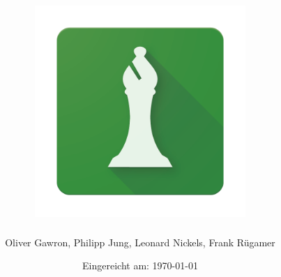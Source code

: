 \documentclass[12pt,oneside,numbers=noenddot,a4paper,parskip]{scrbook}
\def\BaAuthor{Oliver Gawron, Philipp Jung, Leonard Nickels, Frank Rügamer}
\def\BaTitle{\includegraphics[width= 0.6\textwidth]{resources/App_Logo}}
\def\BaSupervisorTwo{Prof.\ Dr.\ Steffen Heinzl}
\def\BaSupervisorOne{Vitaliy Schreibmann}
\begin{document}


\frontmatter
\titlehead{%
  {Hochschule für angewandte Wissenschaften Würzburg-Schweinfurt\\
   Fakultät Informatik und Wirtschaftsinformatik}}
\subject{Dokumentation Programmierprojekt:\linebreak \linebreak Spielesammlung}
\title{\BaTitle\\[15mm]}
\author{\BaAuthor}
\date{\normalsize{Eingereicht am: \today}}
\publishers{
  \normalsize{Betreuer: \BaSupervisorOne}\\
  \normalsize{Zweitpr\"{u}fer: \BaSupervisorTwo}\\
}


\maketitle



\tableofcontents



\mainmatter











\backmatter



\listoffigures
{}

\listoftables

\lstlistoflistings
{}



\printbibliography
{}
\end{document}
